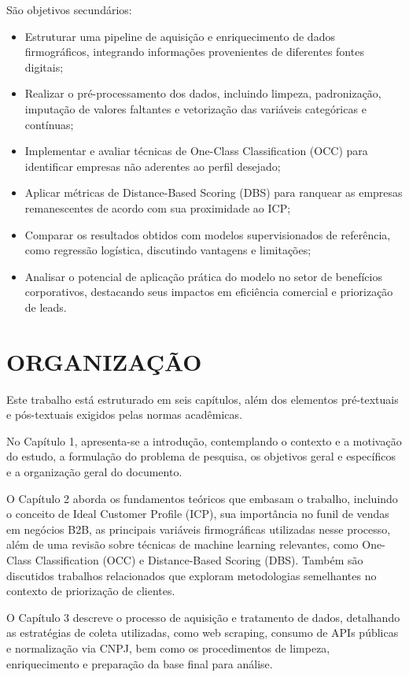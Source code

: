 São objetivos secundários: 

\begin{itemize}
    \item Estruturar uma pipeline de aquisição e enriquecimento de dados firmográficos, integrando informações provenientes de diferentes fontes digitais;
    \item Realizar o pré-processamento dos dados, incluindo limpeza, padronização, imputação de valores faltantes e vetorização das variáveis categóricas e contínuas;
    \item Implementar e avaliar técnicas de One-Class Classification (OCC) para identificar empresas não aderentes ao perfil desejado;
    \item Aplicar métricas de Distance-Based Scoring (DBS) para ranquear as empresas remanescentes de acordo com sua proximidade ao ICP;
    \item Comparar os resultados obtidos com modelos supervisionados de referência, como regressão logística, discutindo vantagens e limitações;
    \item Analisar o potencial de aplicação prática do modelo no setor de benefícios corporativos, destacando seus impactos em eficiência comercial e priorização de leads.
\end{itemize}

\section{ORGANIZAÇÃO}

Este trabalho está estruturado em seis capítulos, além dos elementos pré-textuais e pós-textuais exigidos pelas normas acadêmicas.

No Capítulo 1, apresenta-se a introdução, contemplando o contexto e a motivação do estudo, a formulação do problema de pesquisa, os objetivos geral e específicos e a organização geral do documento.  

O Capítulo 2 aborda os fundamentos teóricos que embasam o trabalho, incluindo o conceito de Ideal Customer Profile (ICP), sua importância no funil de vendas em negócios B2B, as principais variáveis firmográficas utilizadas nesse processo, além de uma revisão sobre técnicas de machine learning relevantes, como One-Class Classification (OCC) e Distance-Based Scoring (DBS). Também são discutidos trabalhos relacionados que exploram metodologias semelhantes no contexto de priorização de clientes.  

O Capítulo 3 descreve o processo de aquisição e tratamento de dados, detalhando as estratégias de coleta utilizadas, como web scraping, consumo de APIs públicas e normalização via CNPJ, bem como os procedimentos de limpeza, enriquecimento e preparação da base final para análise.  

